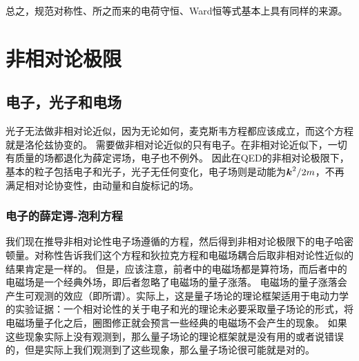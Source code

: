 总之，规范对称性、所之而来的电荷守恒、Ward恒等式基本上具有同样的来源。

\section{非相对论极限}

\subsection{电子，光子和电场}\label{sec:electron-photon-interaction}

光子无法做非相对论近似，因为无论如何，麦克斯韦方程都应该成立，而这个方程就是洛伦兹协变的。
需要做非相对论近似的只有电子。在非相对论近似下，一切有质量的场都退化为薛定谔场，电子也不例外。
因此在QED的非相对论极限下，基本的粒子包括电子和光子，光子无任何变化，电子场则是动能为$\vb*{k}^2 / 2m$，不再满足相对论协变性，由动量和自旋标记的场。

\subsubsection{电子的薛定谔-泡利方程}

我们现在推导非相对论性电子场遵循的方程，然后得到非相对论极限下的电子哈密顿量。对称性告诉我们这个方程和狄拉克方程和电磁场耦合后取非相对论性近似的结果肯定是一样的。
但是，应该注意，前者中的电磁场都是算符场，而后者中的电磁场是一个经典外场，即后者忽略了电磁场的量子涨落。
电磁场的量子涨落会产生可观测的效应（即所谓）。实际上，这是量子场论的理论框架适用于电动力学的实验证据：一个相对论性的关于电子和光的理论未必要采取量子场论的形式，将电磁场量子化之后，圈图修正就会预言一些经典的电磁场不会产生的现象。
如果这些现象实际上没有观测到，那么量子场论的理论框架就是没有用的或者说错误的，但是实际上我们观测到了这些现象，那么量子场论很可能就是对的。

